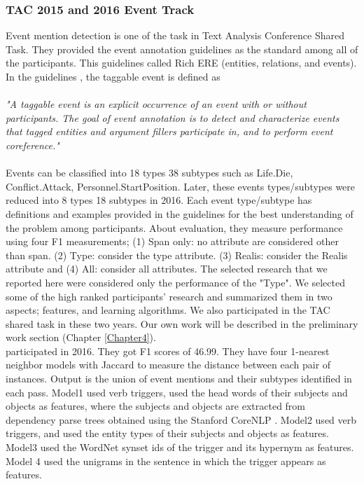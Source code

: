 \subsubsection{TAC 2015 and 2016 Event Track}
\label{tac}
Event mention detection is one of the task in Text Analysis Conference Shared Task. They provided the event annotation guidelines as the standard among all of the participants. This guidelines called Rich ERE (entities, relations, and events). In the guidelines \cite{richere42}, the taggable event is defined as \\ \\
\textit{"A taggable event is an explicit occurrence of an event with or without  participants. The goal of event annotation is to detect and characterize events  that tagged entities and argument fillers participate in, and to perform event coreference."} \\ \\
\indent Events can be classified into 18 types 38 subtypes such as Life.Die, Conflict.Attack, Personnel.StartPosition. Later, these events types/subtypes were reduced into 8 types 18 subtypes in 2016. Each event type/subtype has definitions and examples provided in the guidelines for the best understanding of the problem among participants. About evaluation, they measure performance using four F1 measurements; (1) Span only: no attribute are considered other than span. (2) Type: consider the type attribute. (3) Realis: consider the Realis attribute and (4) All: consider all attributes. The selected research that we reported here were considered only the performance of the "Type". We selected some of the high ranked participants’ research and summarized them in two aspects; features, and learning algorithms. We also participated in the TAC shared task in these two years. Our own work will be described in the preliminary work section (Chapter \ref{Chapter4}).\\
\indent \cite{lu2016event} participated in 2016. They got F1 scores of 46.99. They have four 1-nearest neighbor models with Jaccard to measure the distance between each pair of instances. Output is the union of event mentions and their subtypes identiﬁed in each pass. Model1 used verb triggers, used the head words of their subjects and objects as features, where the subjects and objects are extracted from dependency parse trees obtained using the Stanford CoreNLP \cite{manning2014stanford}. Model2 used verb triggers, and used the entity types of their subjects and objects as features. Model3 used the WordNet synset ids of the trigger and its hypernym as features. Model 4 used the unigrams in the sentence in which the trigger appears as features.\\

